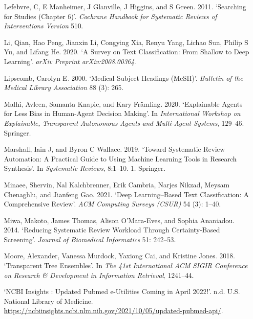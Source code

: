 \documentclass{article}
\newlength{\cslhangindent}
\newenvironment{CSLReferences}[2] %
 {%
  \setlength{\parindent}{0pt}
  \ifodd #1 \everypar{\setlength{\hangindent}{\cslhangindent}}\ignorespaces\fi
  \ifnum #2 > 0
  \setlength{\parskip}{#2\baselineskip}
  \fi
 }%
 {}
\begin{document}
\begin{CSLReferences}{1}{0}
\leavevmode{}%
Lefebvre, C, E Manheimer, J Glanville, J Higgins, and S Green. 2011.
{`Searching for Studies (Chapter 6)'}. \emph{Cochrane Handbook for
Systematic Reviews of Interventions Version} 510.

\leavevmode{}%
Li, Qian, Hao Peng, Jianxin Li, Congying Xia, Renyu Yang, Lichao Sun,
Philip S Yu, and Lifang He. 2020. {`A Survey on Text Classification:
From Shallow to Deep Learning'}. \emph{arXiv Preprint arXiv:2008.00364}.

\leavevmode{}%
Lipscomb, Carolyn E. 2000. {`Medical Subject Headings (MeSH)'}.
\emph{Bulletin of the Medical Library Association} 88 (3): 265.

\leavevmode{}%
Malhi, Avleen, Samanta Knapic, and Kary Främling. 2020. {`Explainable
Agents for Less Bias in Human-Agent Decision Making'}. In
\emph{International Workshop on Explainable, Transparent Autonomous
Agents and Multi-Agent Systems}, 129--46. Springer.

\leavevmode{}%
Marshall, Iain J, and Byron C Wallace. 2019. {`Toward Systematic Review
Automation: A Practical Guide to Using Machine Learning Tools in
Research Synthesis'}. In \emph{Systematic Reviews}, 8:1--10. 1.
Springer.

\leavevmode{}%
Minaee, Shervin, Nal Kalchbrenner, Erik Cambria, Narjes Nikzad, Meysam
Chenaghlu, and Jianfeng Gao. 2021. {`Deep Learning--Based Text
Classification: A Comprehensive Review'}. \emph{ACM Computing Surveys
(CSUR)} 54 (3): 1--40.

\leavevmode{}%
Miwa, Makoto, James Thomas, Alison O'Mara-Eves, and Sophia Ananiadou.
2014. {`Reducing Systematic Review Workload Through Certainty-Based
Screening'}. \emph{Journal of Biomedical Informatics} 51: 242--53.

\leavevmode{}%
Moore, Alexander, Vanessa Murdock, Yaxiong Cai, and Kristine Jones.
2018. {`Transparent Tree Ensembles'}. In \emph{The 41st International
ACM SIGIR Conference on Research \& Development in Information
Retrieval}, 1241--44.

\leavevmode{}%
{`NCBI Insights : Updated Pubmed e-Utilities Coming in April 2022!'}.
n.d. U.S. National Library of Medicine.
\url{https://ncbiinsights.ncbi.nlm.nih.gov/2021/10/05/updated-pubmed-api/}.


\end{CSLReferences}
\end{document}
